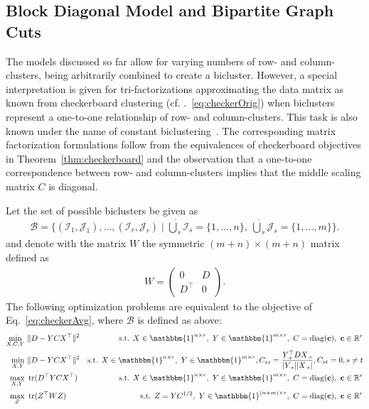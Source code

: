 \subsection{Block Diagonal Model and Bipartite Graph Cuts}
The models discussed so far allow for varying numbers of row- and column- clusters, being arbitrarily combined to create a bicluster. However, a special interpretation is given for tri-factorizations approximating the data matrix as known from checkerboard clustering (cf. \@Eq.~\eqref{eq:checkerOrig}) when biclusters represent a one-to-one relationship of row- and column-clusters. This task is also known under the name of constant biclustering~\citep{madeira2004biclustering}. The corresponding matrix factorization formulations follow from the equivalences of checkerboard objectives in Theorem~\ref{thm:checkerboard} and the observation that a one-to-one correspondence between row- and column-clusters implies that the middle scaling matrix $C$ is diagonal.
\begin{corollary}\label{thm:blockdiagonal}
Let the set of possible biclusters be given as
\begin{align*}
    \mathcal{B} = \{(\mathcal{I}_1,\mathcal{J}_1),\ldots, (\mathcal{I}_r,\mathcal{J}_r)\mid \dot\bigcup_{s}\mathcal{I}_s=\{1,\ldots,n\},\  \dot\bigcup_{s}\mathcal{J}_s=\{1,\ldots,m\}\}.
\end{align*}
and denote with the matrix $W$ the symmetric $(m+ n)\times (m+n)$ matrix defined as
\begin{align*}
   W=
\begin{pmatrix}
0 & D\\
D^\top & 0
\end{pmatrix}. 
\end{align*}
The following optimization problems are equivalent to the objective of Eq.~\eqref{eq:checkerAvg}, where $\mathcal{B}$ is defined as above:
\begin{align}
    \label{eq:blockDiagC}
    \min_{X,C,Y}&\ \|D-YCX^\top\|^2 &
    \text{s.t. } X\in \mathbbm{1}^{n\times r},\ Y\in\mathbbm{1}^{m\times r},\ C=\diag(\mathbf{c}),\ \mathbf{c}\in\mathbb{R}^{r}\\ 
    \label{eq:blockDiagAvg}
\min_{X,Y}&\ \|D-YCX^\top\|^2&
\text{s.t. } X\in \mathbbm{1}^{n\times r},\ Y\in\mathbbm{1}^{m\times r}, C_{ss}= \frac{Y_{\cdot s}^\top D X_{\cdot s}}{|Y_{\cdot s}||X_{\cdot s}|}, C_{st}=0, s\neq t\\
\label{eq:blockDiagtr}
\max_{X,Y}&\ \tr(D^\top YCX^\top) &
\text{s.t. } X\in \mathbbm{1}^{n\times r},\ Y\in\mathbbm{1}^{m\times r},\ C=\diag(\mathbf{c}),\ \mathbf{c}\in\mathbb{R}^{r}\\
\label{eq:blockDiagW}
\max_{Z}&\ \tr(Z^\top WZ) &
\text{s.t. }  Z=YC^{1/2},\ Y\in \mathbbm{1}^{(n+m)\times r},\ C=\diag(\mathbf{c}),\ \mathbf{c}\in\mathbb{R}^{r}
\end{align}
\end{corollary}
